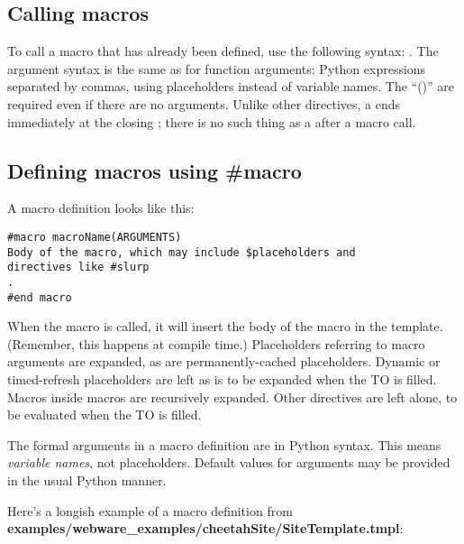 \subsection{Calling macros}
\label{macros.calling}

To call a macro that has already been defined, use the following syntax:
.  The argument syntax is the same as for function
arguments: Python expressions separated by commas, using placeholders instead
of variable names.  The ``()'' are required even if there are no arguments.
Unlike other directives, a  ends immediately at the closing \code{()};
there is no such thing as a \code{\/\#} after a macro call.


\subsection{Defining macros using \#macro}
\label{macros.definingMacros}

A macro definition looks like this:

\begin{verbatim}
#macro macroName(ARGUMENTS)
Body of the macro, which may include $placeholders and
directives like #slurp
.
#end macro
\end{verbatim}

When the macro is called, it will insert the body of the macro in the 
template.  (Remember, this happens at compile time.)  Placeholders referring to
macro arguments are expanded, as are permanently-cached placeholders.
Dynamic or timed-refresh placeholders are left as is to be expanded when the TO
is filled.  Macros inside macros are recursively expanded.  Other directives 
are left alone, to be evaluated when the TO is filled.

The formal arguments in a macro definition are in Python syntax.  This means
{\em variable names}, not placeholders.  Default values for arguments may be
provided in the usual Python manner.

Here's a longish example of a macro definition from 
{\bf examples/webware\_examples/cheetahSite/SiteTemplate.tmpl}:

